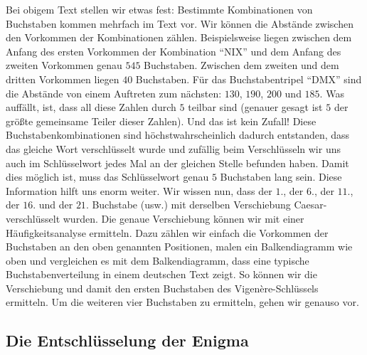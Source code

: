 \documentclass[a4paper,ngerman,12pt]{scrartcl}
\theoremstyle{definition}
\begin{document}
Bei obigem Text stellen wir etwas fest: Bestimmte Kombinationen von Buchstaben kommen mehrfach im Text vor. Wir können die Abstände zwischen den Vorkommen der Kombinationen zählen. Beispielsweise liegen zwischen dem Anfang des ersten Vorkommen der Kombination "`NIX"' und dem Anfang des zweiten Vorkommen genau $545$ Buchstaben. Zwischen dem zweiten und dem dritten Vorkommen liegen $40$ Buchstaben. Für das Buchstabentripel "`DMX"' sind die Abstände von einem Auftreten zum nächsten: $130$, $190$, $200$ und $185$. Was auffällt, ist, dass all diese Zahlen durch $5$ teilbar sind (genauer gesagt ist $5$ der größte gemeinsame Teiler dieser Zahlen). Und das ist kein Zufall! Diese Buchstabenkombinationen sind höchstwahrscheinlich dadurch entstanden, dass das gleiche Wort verschlüsselt wurde und zufällig beim Verschlüsseln wir uns auch im Schlüsselwort jedes Mal an der gleichen Stelle befunden haben. Damit dies möglich ist, muss das Schlüsselwort genau $5$ Buchstaben lang sein. Diese Information hilft uns enorm weiter. Wir wissen nun, dass der $1$., der $6$., der $11$., der $16$. und der $21$. Buchstabe (usw.) mit derselben Verschiebung Caesar-verschlüsselt wurden. Die genaue Verschiebung können wir mit einer Häufigkeitsanalyse ermitteln. Dazu zählen wir einfach die Vorkommen der Buchstaben an den oben genannten Positionen, malen ein Balkendiagramm wie oben und vergleichen es mit dem Balkendiagramm, dass eine typische Buchstabenverteilung in einem deutschen Text zeigt. So können wir die Verschiebung und damit den ersten Buchstaben des Vigenère-Schlüssels ermitteln. Um die weiteren vier Buchstaben zu ermitteln, gehen wir genauso vor.

\subsection{Die Entschlüsselung der Enigma}
\end{document}
